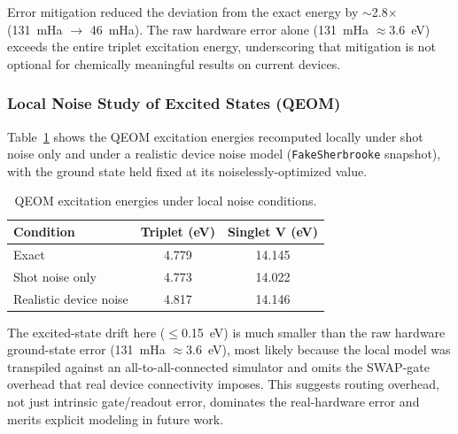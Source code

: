 \documentclass[10pt]{article}
\begin{document}
Error mitigation reduced the deviation from the exact energy by $\sim$2.8$\times$
(131~mHa $\to$ 46~mHa). The raw hardware error alone (131~mHa $\approx 3.6$~eV)
exceeds the entire triplet excitation energy, underscoring that mitigation is
not optional for chemically meaningful results on current devices.

\subsubsection{Local Noise Study of Excited States (QEOM)}
Table~\ref{tab:qeom_noise} shows the QEOM excitation energies recomputed
locally under shot noise only and under a realistic device noise model
(\texttt{FakeSherbrooke} snapshot), with the ground state held fixed at its
noiselessly-optimized value.

\begin{table}[h]
\centering
\caption{QEOM excitation energies under local noise conditions.}
\label{tab:qeom_noise}
\begin{tabular}{lcc}
\toprule
Condition & Triplet (eV) & Singlet V (eV) \\
\midrule
Exact & 4.779 & 14.145 \\
Shot noise only & 4.773 & 14.022 \\
Realistic device noise & 4.817 & 14.146 \\
\bottomrule
\end{tabular}
\end{table}

The excited-state drift here ($\leq$0.15~eV) is much smaller than the raw
hardware ground-state error (131~mHa $\approx 3.6$~eV), most likely because
the local model was transpiled against an all-to-all-connected simulator and
omits the SWAP-gate overhead that real device connectivity imposes. This
suggests routing overhead, not just intrinsic gate/readout error, dominates
the real-hardware error and merits explicit modeling in future work.
\end{document}
